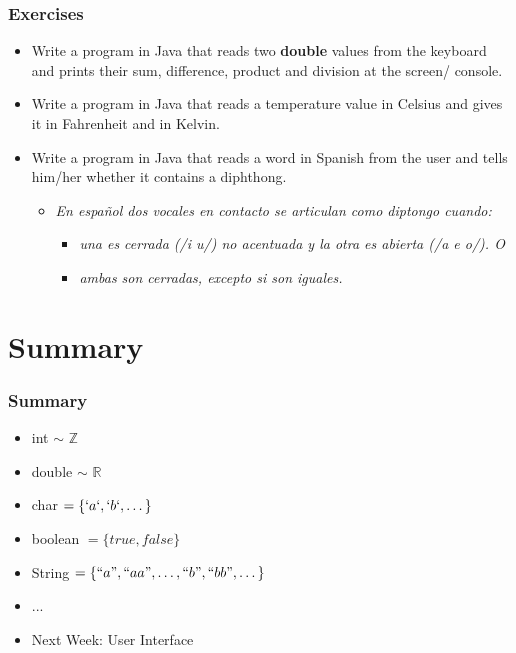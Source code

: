 \documentclass{beamer}
\begin{document}
	\begin{frame}
		\frametitle{Exercises}
		\begin{itemize}
			\item Write a program in Java that reads two \textbf{double} values from the keyboard and prints their sum, difference, product and division at the screen/ console.
			\pause
			\item Write a program in Java that reads a temperature value in Celsius and gives it in Fahrenheit and in Kelvin.
			\pause
			\item Write a program in Java that reads a word in Spanish from the user and tells him/her whether it contains a diphthong.
			\begin{itemize}
				\item \textit{En español dos vocales en contacto se articulan como diptongo cuando:}
				\begin{itemize}
					\item \textit{una es cerrada (/i u/) no acentuada y la otra es abierta (/a e o/). O}
					\item \textit{ambas son cerradas, excepto si son iguales.}
				\end{itemize}
			\end{itemize}
		\end{itemize}
	\end{frame}
	
	\section{Summary}
	
	\begin{frame}
		\frametitle{Summary}
		\begin{itemize}
			\item int $\sim$ $\mathbb{Z}$
			\item double $\sim$ $\mathbb{R}$
			\item char $= \{`a`, `b`, \dots \}$
			\item boolean $= \{true, false\}$
			\item String $= \{``a", ``aa", \dots, ``b", ``bb", \dots \}$
			\item ...
		\end{itemize}
		\begin{itemize}
			\item Next Week: User Interface
		\end{itemize}
	\end{frame}
\end{document}

